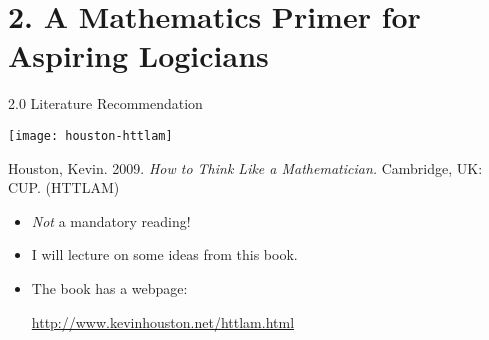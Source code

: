 \section{2. A Mathematics Primer for Aspiring Logicians}
\begin{frame}{2.0 Literature Recommendation}

	\begin{center}
		\texttt{[image: houston-httlam]}
	\end{center}

Houston, Kevin. 2009. \emph{How to Think Like a Mathematician.} Cambridge, UK: CUP. (HTTLAM)

\begin{itemize}

	\item \emph{Not} a mandatory reading!
	
	\item I will lecture on some ideas from this book.

	\item The book has a webpage:

	\begin{center}
	\url{http://www.kevinhouston.net/httlam.html}
	\end{center}
	
\end{itemize}

\end{frame}


